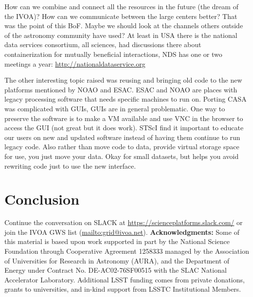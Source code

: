\documentclass[11pt,twoside]{article}
\begin{document}
How can we combine and connect all the resources in the future (the dream of the IVOA)?
How can we communicate between the large centers better?
That was the point of this BoF.
Maybe we should look at the channels others outside of the astronomy community have used?
At least in USA there is the  national data services consortium, all sciences, had discussions there about containerization for mutually beneficial interactions, NDS has one or two meetings a year: \url{http://nationaldataservice.org}


The other interesting topic raised was  reusing and bringing old code to the new platforms mentioned by NOAO and ESAC.
ESAC and NOAO are places with legacy processing software that needs specific machines to run on.
Porting CASA was complicated with GUIs, GUIs are in general problematic.
One way to preserve the software is to make a VM available and use VNC in the browser to access the GUI (not great but it does work).
STScI find it  important to educate our users on new and updated software instead of having them continue to run legacy code.
Also rather than move code to data, provide virtual storage space for use, you just move your data. Okay for small datasets, but helps you avoid rewriting code just to use the new interface.




\section{Conclusion}
Continue the conversation on SLACK at \url{https://scienceplatforms.slack.com/} or join the IVOA GWS list (\url{mailto:grid@ivoa.net}).
\newline
{\bf Acknowledgments:} Some of this
material is based upon work supported in part by the National Science Foundation
through Cooperative Agreement 1258333 managed by the Association of Universities
for Research in Astronomy (AURA), and the Department of Energy under Contract No.
DE-AC02-76SF00515 with the SLAC National Accelerator Laboratory. Additional
LSST funding comes from private donations, grants to universities, and in-kind support
from LSSTC Institutional Members.
\end{document}
